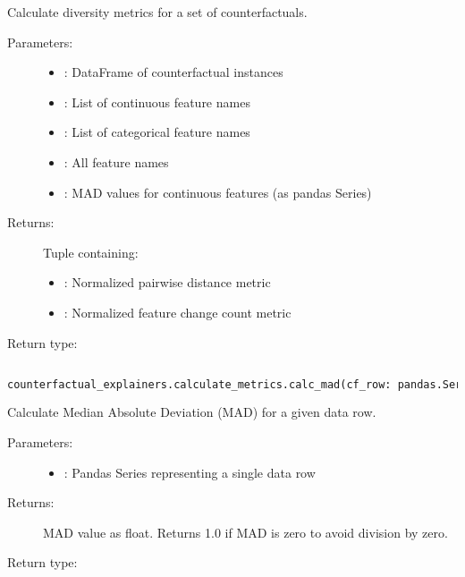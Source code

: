 Calculate diversity metrics for a set of counterfactuals.

\begin{description}
    \item[Parameters:]
        \begin{itemize}
            \item {}: DataFrame of counterfactual instances
            \item {}: List of continuous feature names
            \item {}: List of categorical feature names
            \item {}: All feature names
            \item {}: MAD values for continuous features (as pandas Series)
        \end{itemize}
    \item[Returns:] Tuple containing:
        \begin{itemize}
            \item {}: Normalized pairwise distance metric
            \item {}: Normalized feature change count metric
        \end{itemize}
    \item[Return type:] 
\end{description}


\subsection{}
\label{func:calc_mad}

\begin{lstlisting}[language=Python, caption={Function Signature}]
counterfactual_explainers.calculate_metrics.calc_mad(cf_row: pandas.Series) -> float
\end{lstlisting}

Calculate Median Absolute Deviation (MAD) for a given data row.

\begin{description}
    \item[Parameters:]
        \begin{itemize}
            \item {}: Pandas Series representing a single data row
        \end{itemize}
    \item[Returns:] MAD value as float. Returns 1.0 if MAD is zero to avoid division by zero.
    \item[Return type:] 
\end{description}


